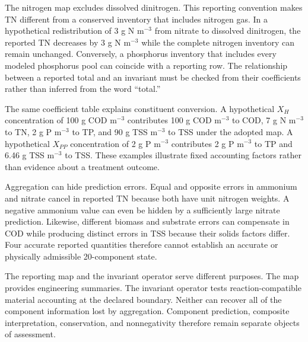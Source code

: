 The nitrogen map excludes dissolved dinitrogen. This reporting convention makes TN different from a conserved inventory that includes nitrogen gas. In a hypothetical redistribution of 3 g N m$^{-3}$ from nitrate to dissolved dinitrogen, the reported TN decreases by 3 g N m$^{-3}$ while the complete nitrogen inventory can remain unchanged. Conversely, a phosphorus inventory that includes every modeled phosphorus pool can coincide with a reporting row. The relationship between a reported total and an invariant must be checked from their coefficients rather than inferred from the word ``total.''

The same coefficient table explains constituent conversion. A hypothetical $X_H$ concentration of 100 g COD m$^{-3}$ contributes 100 g COD m$^{-3}$ to COD, 7 g N m$^{-3}$ to TN, 2 g P m$^{-3}$ to TP, and 90 g TSS m$^{-3}$ to TSS under the adopted map. A hypothetical $X_{PP}$ concentration of 2 g P m$^{-3}$ contributes 2 g P m$^{-3}$ to TP and 6.46 g TSS m$^{-3}$ to TSS. These examples illustrate fixed accounting factors rather than evidence about a treatment outcome.

Aggregation can hide prediction errors. Equal and opposite errors in ammonium and nitrate cancel in reported TN because both have unit nitrogen weights. A negative ammonium value can even be hidden by a sufficiently large nitrate prediction. Likewise, different biomass and substrate errors can compensate in COD while producing distinct errors in TSS because their solids factors differ. Four accurate reported quantities therefore cannot establish an accurate or physically admissible 20-component state.

The reporting map and the invariant operator serve different purposes. The map provides engineering summaries. The invariant operator tests reaction-compatible material accounting at the declared boundary. Neither can recover all of the component information lost by aggregation. Component prediction, composite interpretation, conservation, and nonnegativity therefore remain separate objects of assessment.
